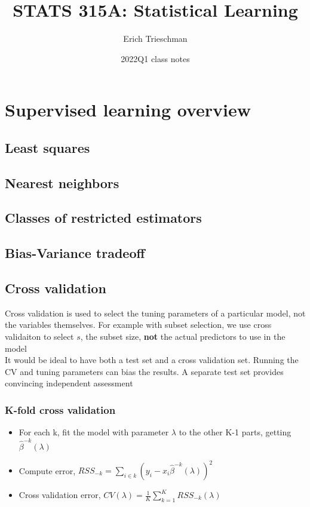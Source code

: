 \documentclass{article}
\title{STATS 315A: Statistical Learning}
\author{Erich Trieschman}
\date{2022Q1 class notes}
\begin{document}
\maketitle


\section{Supervised learning overview}
\subsection{Least squares}
\subsection{Nearest neighbors}
\subsection{Classes of restricted estimators}
\subsection{Bias-Variance tradeoff}
\subsection{Cross validation}
Cross validation is used to select the tuning parameters of a particular model, not the variables themselves. For example with subset selection, we use cross validaiton to select $s$, the subset size, \textbf{not} the actual predictors to use in the model\\
It would be ideal to have both a test set and a cross validation set. Running the CV and tuning parameters can bias the results. A separate test set provides convincing independent assessment
\subsubsection{K-fold cross validation}
\begin{itemize}
  \item For each k, fit the model with parameter $\lambda$ to the other K-1 parts, getting $\hat{\beta}^{-k}(\lambda)$
  \item Compute error, $RSS_{-k} = \sum_{i \in k}(y_i - x_i\hat{\beta}^{-k}(\lambda))^2$
  \item Cross validation error, $CV(\lambda) = \frac{1}{K}\sum_{k=1}^KRSS_{-k}(\lambda)$
\end{itemize}
\end{document}
